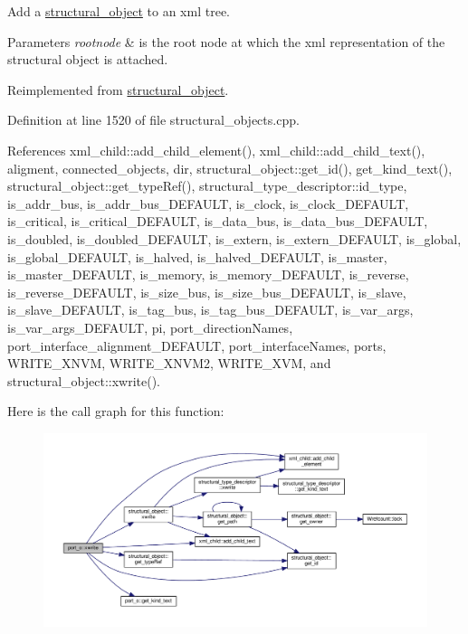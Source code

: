 Add a \hyperlink{classstructural__object}{structural\+\_\+object} to an xml tree. 


\begin{DoxyParams}{Parameters}
{\em rootnode} & is the root node at which the xml representation of the structural object is attached. \\
\hline
\end{DoxyParams}


Reimplemented from \hyperlink{classstructural__object_a7b0b509094451578b2dc10a9b716b16e}{structural\+\_\+object}.



Definition at line 1520 of file structural\+\_\+objects.\+cpp.



References xml\+\_\+child\+::add\+\_\+child\+\_\+element(), xml\+\_\+child\+::add\+\_\+child\+\_\+text(), aligment, connected\+\_\+objects, dir, structural\+\_\+object\+::get\+\_\+id(), get\+\_\+kind\+\_\+text(), structural\+\_\+object\+::get\+\_\+type\+Ref(), structural\+\_\+type\+\_\+descriptor\+::id\+\_\+type, is\+\_\+addr\+\_\+bus, is\+\_\+addr\+\_\+bus\+\_\+\+D\+E\+F\+A\+U\+LT, is\+\_\+clock, is\+\_\+clock\+\_\+\+D\+E\+F\+A\+U\+LT, is\+\_\+critical, is\+\_\+critical\+\_\+\+D\+E\+F\+A\+U\+LT, is\+\_\+data\+\_\+bus, is\+\_\+data\+\_\+bus\+\_\+\+D\+E\+F\+A\+U\+LT, is\+\_\+doubled, is\+\_\+doubled\+\_\+\+D\+E\+F\+A\+U\+LT, is\+\_\+extern, is\+\_\+extern\+\_\+\+D\+E\+F\+A\+U\+LT, is\+\_\+global, is\+\_\+global\+\_\+\+D\+E\+F\+A\+U\+LT, is\+\_\+halved, is\+\_\+halved\+\_\+\+D\+E\+F\+A\+U\+LT, is\+\_\+master, is\+\_\+master\+\_\+\+D\+E\+F\+A\+U\+LT, is\+\_\+memory, is\+\_\+memory\+\_\+\+D\+E\+F\+A\+U\+LT, is\+\_\+reverse, is\+\_\+reverse\+\_\+\+D\+E\+F\+A\+U\+LT, is\+\_\+size\+\_\+bus, is\+\_\+size\+\_\+bus\+\_\+\+D\+E\+F\+A\+U\+LT, is\+\_\+slave, is\+\_\+slave\+\_\+\+D\+E\+F\+A\+U\+LT, is\+\_\+tag\+\_\+bus, is\+\_\+tag\+\_\+bus\+\_\+\+D\+E\+F\+A\+U\+LT, is\+\_\+var\+\_\+args, is\+\_\+var\+\_\+args\+\_\+\+D\+E\+F\+A\+U\+LT, pi, port\+\_\+direction\+Names, port\+\_\+interface\+\_\+alignment\+\_\+\+D\+E\+F\+A\+U\+LT, port\+\_\+interface\+Names, ports, W\+R\+I\+T\+E\+\_\+\+X\+N\+VM, W\+R\+I\+T\+E\+\_\+\+X\+N\+V\+M2, W\+R\+I\+T\+E\+\_\+\+X\+VM, and structural\+\_\+object\+::xwrite().

Here is the call graph for this function\+:
\nopagebreak
\begin{figure}[H]
\begin{center}
\leavevmode
\includegraphics[width=350pt]{df/d75/structport__o_a134c66609a971e40a34dfdea50eb57dd_cgraph}
\end{center}
\end{figure}


